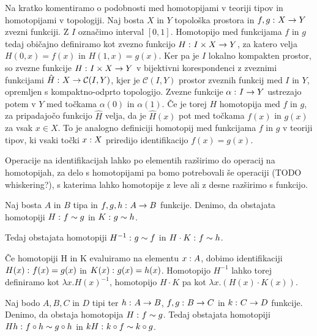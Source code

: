 \begin{opomba}
  Na kratko komentiramo o podobnosti med homotopijami v teoriji tipov in homotopijami v
  topologiji. Naj bosta \(X\) in \(Y\) topološka prostora in
  \(f, g \,\colon X \to Y\) zvezni
  funkciji. Z \(I\) označimo interval \([0, 1]\). Homotopijo med funkcijama \(f\) in \(g\)
  tedaj običajno definiramo kot zvezno funkcijo \(H \,\colon I \times X \to Y\), za katero velja
  \(H(0, x) = f(x)\) in \(H(1, x) = g(x)\). Ker pa je \(I\) lokalno kompakten prostor, so
  zvezne funkcije \(H \,\colon I \times X \to Y\) v bijektivni korespondenci z zveznimi funkcijami
  \(\hat{H} \,\colon X \to \mathcal{C}(I, Y)\), kjer je \(\mathcal{C}(I, Y)\) prostor zveznih funkcij med \(I\) in
  \(Y\), opremljen s kompaktno-odprto topologijo. Zvezne funkcije \(\alpha \,\colon I \to Y\)
  ustrezajo potem v \(Y\) med točkama \(\alpha(0)\) in \(\alpha(1)\). Če je torej \(H\)
  homotopija med \(f\) in \(g\), za pripadajočo funkcijo \(\hat{H}\) velja, da je
  \(\hat{H}(x)\) pot med točkama \(f(x)\) in \(g(x)\) za vsak \(x \in X\). To je analogno
  definiciji homotopij med funkcijama \(f\) in \(g\) v teoriji tipov, ki vsaki točki
  \(x : X\) priredijo identifikacijo \(f(x) = g(x)\).
\end{opomba}

Operacije na identifikacijah lahko po elementih razširimo do operacij na homotopijah,
za delo s homotopijami
pa bomo potrebovali še operaciji (TODO whiskering?), s katerima lahko homotopije z leve ali
z desne razširimo s funkcijo.

\begin{trditev}
  Naj bosta \(A\) in \(B\) tipa in \(f, g, h \,\colon A \to B\) funkcije. Denimo, da obstajata
  homotopiji \(H \,\colon f \sim g\) in \(K \,\colon g \sim h\).

  Tedaj obstajata homotopiji \(H^{-1} \,\colon g \sim f\) in \(H \cdot K \,\colon f \sim h\).
\end{trditev}

\begin{dokaz}
  Če homotopiji H in K evaluiramo na elementu \(x : A\), dobimo identifikaciji
  \(H(x) \,\colon f(x) = g(x)\) in \(K(x) \,\colon g(x) = h(x)\). Homotopijo \(H^{-1}\) lahko
  torej definiramo kot \(\lambda x. H(x)^{-1}\), homotopijo \(H \cdot K\) pa kot \(\lambda x.(H(x) \cdot K(x))\).
\end{dokaz}

\begin{trditev}
  Naj bodo \(A, B, C\) in \(D\) tipi ter \(h \,\colon A \to B\), \(f, g \,\colon B \to C\) in
  \(k \,\colon C \to D\) funkcije. Denimo, da obstaja homotopija \(H \,\colon f \sim g\).
  Tedaj obstajata homotopiji \(Hh \,\colon f \circ h \sim g \circ h\) in
  \(kH \,\colon k \circ f \sim k \circ g\).
\end{trditev}

